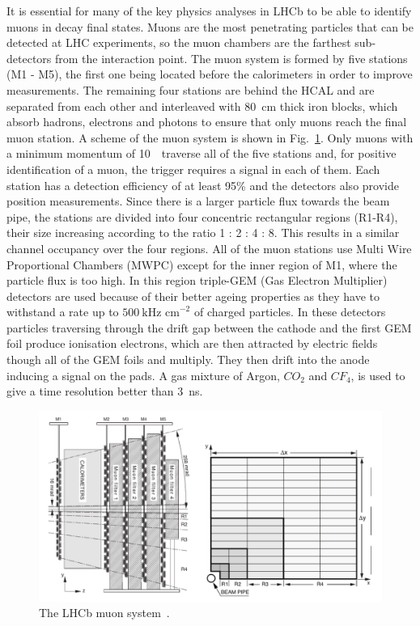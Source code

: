 It is essential for many of the key physics analyses in LHCb to be able to identify muons in decay final states.
Muons are the most penetrating particles that can be detected at LHC experiments, so the muon chambers
are the farthest sub-detectors from the interaction point. The muon system is formed by five stations (M1 - M5),
the first one being located before the calorimeters in order to improve \pt measurements. The remaining four stations
are behind the HCAL and are separated from each other and interleaved with 80~cm thick iron blocks, which absorb
hadrons, electrons and photons to ensure that only muons reach the final muon station. 
A scheme of the muon system is shown in Fig.~\ref{fig:muonsystem}.
Only muons with a minimum momentum of 10~\gevc~traverse all of the
five stations and, for positive identification of a muon, the trigger requires a signal in each of them.
Each station has a detection efficiency of at least 95\% and the detectors also provide position measurements.
Since there is a larger particle flux towards the beam pipe, the stations are divided
into four concentric rectangular regions (R1-R4), their size increasing according to the ratio 1 : 2 : 4 : 8.
This results in a similar channel occupancy over the four regions. All of the muon stations use
Multi Wire Proportional Chambers (MWPC) except for the inner region of M1, where the particle flux is too high.
In this region triple-GEM (Gas Electron Multiplier) detectors are used because of their better ageing properties
as they have to withstand a rate up to $500 ~\mbox{kHz cm}^{-2}$ of charged particles. In these detectors particles 
traversing through the drift gap between the cathode and the first GEM foil produce ionisation electrons, which are then 
attracted by electric fields though all of the GEM foils and multiply. They then drift into the anode inducing a signal on the 
pads. A gas mixture of Argon, $CO_2$ and $CF_4$, is used to give a time resolution better than 3~ns.
%
\begin{figure}[h!]
\centering \includegraphics[width=1.0\textwidth]{Detector/figs/muon.png}
\caption{The LHCb muon system~\cite{Alves:2008zz}.}
\label{fig:muonsystem}
\end{figure}

